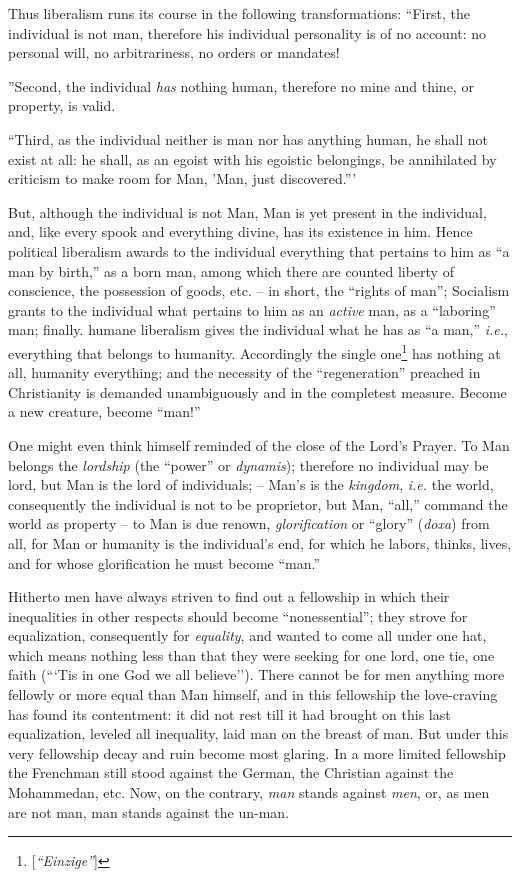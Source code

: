 \documentclass[12pt,a4paper]{book}
\begin{document}
Thus liberalism runs its course in the following transformations: ``First, 
the individual is not man, therefore his individual personality is of no 
account: no personal will, no arbitrariness, no orders or mandates!

''Second, the individual \textit{has} nothing human, therefore no mine and 
thine, or property, is valid.

``Third, as the individual neither is man nor has anything human, he shall 
not exist at all: he shall, as an egoist with his egoistic belongings, be 
annihilated by criticism to make room for Man, 'Man, just discovered.'''

But, although the individual is not Man, Man is yet present in the individual, 
and, like every spook and everything divine, has its existence in him. Hence 
political liberalism awards to the individual everything that pertains to him 
as ``a man by birth,'' as a born man, among which there are counted liberty 
of conscience, the possession of goods, etc. -- in short, the ``rights of 
man''; Socialism grants to the individual what pertains to him as an 
\textit{active} man, as a ``laboring'' man; finally. humane liberalism gives 
the individual what he has as ``a man,'' \textit{i.e.}, everything that 
belongs to humanity. Accordingly the single 
one\footnote{[\textit{``Einzige''}]} has nothing at all, humanity 
everything; and the necessity of the ``regeneration'' preached in 
Christianity is demanded unambiguously and in the completest measure. Become a 
new creature, become ``man!''

One might even think himself reminded of the close of the Lord's Prayer. To 
Man belongs the \textit{lordship} (the ``power'' or \textit{dynamis}); 
therefore no individual may be lord, but Man is the lord of individuals; -- 
Man's is the \textit{kingdom}, \textit{i.e.} the world, consequently the 
individual is not to be proprietor, but Man, ``all,'' command the world as 
property -- to Man is due renown, \textit{glorification} or ``glory'' 
(\textit{doxa}) from all, for Man or humanity is the individual's end, for 
which he labors, thinks, lives, and for whose glorification he must become 
``man.''

Hitherto men have always striven to find out a fellowship in which their 
inequalities in other respects should become ``nonessential''; they strove 
for equalization, consequently for \textit{equality}, and wanted to come all 
under one hat, which means nothing less than that they were seeking for one 
lord, one tie, one faith (```Tis in one God we all believe''). There cannot 
be for men anything more fellowly or more equal than Man himself, and in this 
fellowship the love-craving has found its contentment: it did not rest till it 
had brought on this last equalization, leveled all inequality, laid man on the 
breast of man. But under this very fellowship decay and ruin become most 
glaring. In a more limited fellowship the Frenchman still stood against the 
German, the Christian against the Mohammedan, etc. Now, on the contrary, 
\textit{man} stands against \textit{men}, or, as men are not man, man stands 
against the un-man.
\end{document}
